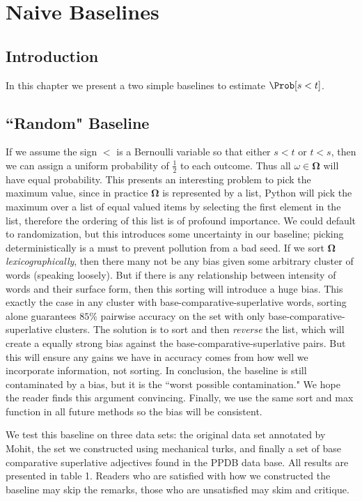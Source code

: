 \section{Naive Baselines}

\subsection{Introduction}

In this chapter we present a two simple baselines to estimate $\Prob[s < t]$. 

\subsection{``Random" Baseline}

If we assume the sign $<$ is a Bernoulli variable so that either $s < t$ or $t < s$, then we can assign a uniform probability of $\frac{1}{2}$ to each outcome. Thus all $\omega \in \pmb{\Omega}$ will have equal probability. This presents an interesting problem to pick the maximum value, since in practice $\pmb{\Omega}$ is represented by a list, Python will pick the maximum over a list of equal valued items by selecting the first element in the list, therefore the ordering of this list is of profound importance. We could default to randomization, but this introduces some uncertainty in our baseline; picking deterministically is a must to prevent pollution from a bad seed. If we sort $\pmb{\Omega}$ \textit{lexicographically}, then there many not be any bias given some arbitrary cluster of words (speaking loosely). But if there is any relationship between intensity of words and their surface form, then this sorting will introduce a huge bias. This exactly the case in any cluster with base-comparative-superlative words, sorting alone guarantees $85\%$ pairwise accuracy on the set with only base-comparative-superlative clusters. The solution is to sort and then \textit{reverse} the list, which will create a equally strong bias against the base-comparative-superlative pairs. But this will ensure any gains we have in accuracy comes from how well we incorporate information, not sorting. In conclusion, the baseline is still contaminated by a bias, but it is the ``worst possible contamination." We hope the reader finds this argument convincing. Finally, we use the same sort and max function in all future methods so the bias will be consistent. 

We test this baseline on three data sets: the original data set annotated by Mohit, the set we constructed using mechanical turks, and finally a set of base comparative superlative adjectives found in the PPDB data base. All results are presented in table 1. Readers who are satisfied with how we constructed the baseline may skip the remarks, those who are unsatisfied may skim and critique.

